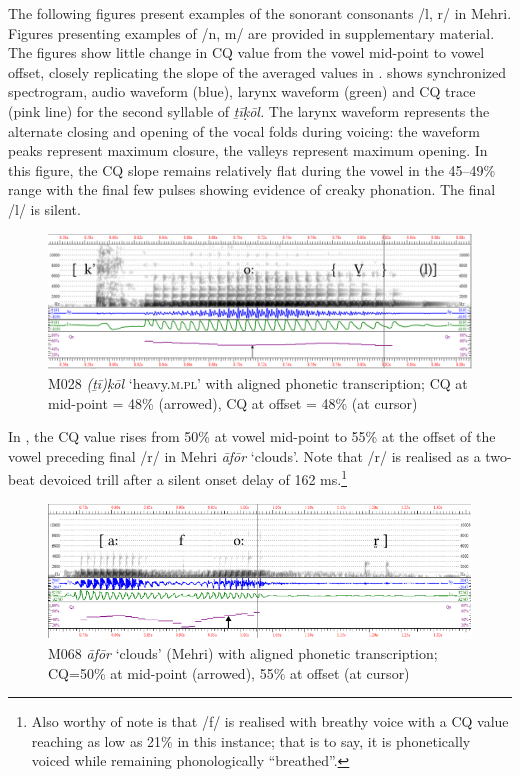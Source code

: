 \documentclass[output=paper]{langscibook}
\begin{document}
The following figures present examples of the sonorant consonants /l, r/ in Mehri. Figures presenting examples of /n, m/ are provided in supplementary material. The figures show little change in CQ value from the vowel mid-point to vowel offset, closely replicating the slope of the averaged values in .  shows synchronized spectrogram, audio waveform (blue), larynx waveform (green) and CQ trace (pink line) for the second syllable of \textit{ṯīḳōl.} The larynx waveform represents the alternate closing and opening of the vocal folds during voicing: the waveform peaks represent maximum closure, the valleys represent maximum opening. In this figure, the CQ slope remains relatively flat during the vowel in the 45–49\% range with the final few pulses showing evidence of creaky phonation. The final \mbox{/l/} is silent.

\begin{figure}[t]
\includegraphics[width=\textwidth]{figures/a12Watsonetal-img021.pdf}
\caption{M028 \textit{(ṯī)ḳōl} ‘heavy.\textsc{m.pl}’ with aligned phonetic transcription; CQ at mid-point = 48\% (arrowed), CQ at offset = 48\% (at cursor)}
\label{fig:watson:17}
\end{figure}

In , the CQ value rises from 50\% at vowel mid-point to 55\% at the offset of the vowel preceding final \mbox{/r/} in Mehri \textit{āfōr} ‘clouds’. Note that \mbox{/r/} is realised as a two-beat devoiced trill after a silent onset delay of 162 ms.\footnote{Also worthy of note is that \mbox{/f/} is realised with breathy voice with a CQ value reaching as low as 21\% in this instance; that is to say, it is phonetically voiced while remaining phonologically ``breathed''.}

\begin{figure}
\includegraphics[width=\textwidth]{figures/a12Watsonetal-img022.pdf}
\caption{M068 \textit{āfōr} ‘clouds’ (Mehri) with aligned phonetic transcription; CQ=50\% at mid-point (arrowed), 55\% at offset (at cursor)}
\label{fig:watson:18}
\end{figure}
\end{document}
